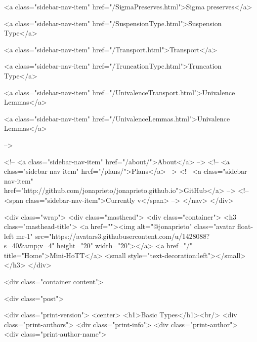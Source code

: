       
        
          <a class="sidebar-nav-item" href="/SigmaPreserves.html">Sigma preserves</a>
        
      
    
      
        
          <a class="sidebar-nav-item" href="/SuspensionType.html">Suspension Type</a>
        
      
    
      
        
          <a class="sidebar-nav-item" href="/Transport.html">Transport</a>
        
      
    
      
        
          <a class="sidebar-nav-item" href="/TruncationType.html">Truncation Type</a>
        
      
    
      
        
          <a class="sidebar-nav-item" href="/UnivalenceTransport.html">Univalence Lemmas</a>
        
      
    
      
        
          <a class="sidebar-nav-item" href="/UnivalenceLemmas.html">Univalence Lemmas</a>
        
      
     -->

    <!-- <a class="sidebar-nav-item" href="/about/">About</a> -->
    <!-- <a class="sidebar-nav-item" href="/plans/">Plans</a> -->
    <!-- <a class="sidebar-nav-item" href="http://github.com/jonaprieto/jonaprieto.github.io">GitHub</a> -->
    <!-- <span class="sidebar-nav-item">Currently v</span> -->
  </nav>
</div>

    <div class="wrap">
      <div class="masthead">
        <div class="container">
          <h3 class="masthead-title">
            <a href=""><img alt="@jonaprieto" class="avatar float-left mr-1" src="https://avatars3.githubusercontent.com/u/1428088?s=40&amp;v=4" height="20" width="20"></a>
            <a href="/" title="Home">Mini-HoTT</a>
            <small style="text-decoration:left"></small>
          </h3>
        </div>
      
      <div class="container content">
        







<div class="post">

  <div class="print-version">
    <center>
      <h1>Basic Types</h1><br/>
        <div class="print-authors">
          <div class="print-info">
            <div class="print-author">
              <div class="print-author-name">
                
